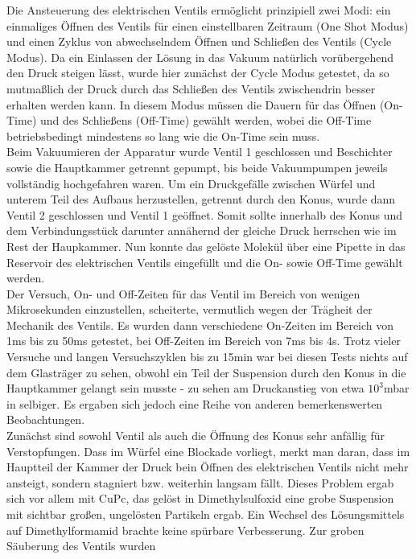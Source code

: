 Die Ansteuerung des elektrischen Ventils ermöglicht
prinzipiell zwei Modi: ein einmaliges Öffnen des
Ventils für einen einstellbaren Zeitraum (One
Shot Modus) und einen Zyklus von abwechselndem
Öffnen und Schließen des Ventils (Cycle Modus).
Da ein Einlassen der Lösung in das Vakuum
natürlich vorübergehend den Druck steigen lässt, wurde hier
zunächst der Cycle Modus getestet, da so
mutmaßlich der Druck durch das Schließen des
Ventils zwischendrin besser erhalten werden
kann. In diesem Modus müssen die Dauern für das
Öffnen (On-Time) und des Schließens (Off-Time)
gewählt werden, wobei die Off-Time
betriebsbedingt mindestens so lang wie die
On-Time sein muss.\\
Beim Vakuumieren der Apparatur wurde Ventil 1
 geschlossen und Beschichter sowie die 
 Hauptkammer getrennt gepumpt, bis beide
 Vakuumpumpen jeweils vollständig hochgefahren
 waren.
 Um ein Druckgefälle zwischen Würfel und unterem
 Teil des Aufbaus herzustellen, getrennt durch den
 Konus, wurde dann Ventil 2 geschlossen und
 Ventil 1 geöffnet.
 Somit sollte innerhalb des Konus und dem
 Verbindungsstück darunter annähernd der gleiche
 Druck herrschen wie im Rest der Haupkammer.
 Nun konnte das gelöste Molekül über eine Pipette
 in das Reservoir des elektrischen Ventils
 eingefüllt und die On- sowie Off-Time gewählt
 werden.\\
 Der Versuch, On- und Off-Zeiten für das Ventil im
Bereich von wenigen Mikrosekunden einzustellen,
scheiterte, vermutlich wegen der Trägheit der Mechanik des
Ventils. Es wurden dann verschiedene On-Zeiten im Bereich von 1ms bis zu 50ms getestet, bei
Off-Zeiten im Bereich von 7ms bis 4s. Trotz vieler Versuche und langen Versuchszyklen bis zu 15min
war bei diesen Tests nichts auf dem Glasträger zu sehen, obwohl ein Teil der Suspension durch den
Konus in die Hauptkammer gelangt sein musste - zu sehen am Druckanstieg von etwa $10^{3}$mbar in
selbiger. Es ergaben sich jedoch eine Reihe von anderen bemerkenswerten Beobachtungen.\\
Zunächst sind sowohl Ventil als auch die Öffnung des Konus sehr anfällig für Verstopfungen. Dass im
Würfel eine Blockade vorliegt, merkt man daran, dass im Hauptteil der Kammer der
Druck bein Öffnen des elektrischen Ventils nicht mehr ansteigt, sondern stagniert bzw. weiterhin
langsam fällt. Dieses Problem ergab sich vor allem mit CuPc, das gelöst in Dimethylsulfoxid eine
grobe Suspension mit sichtbar großen, ungelösten Partikeln ergab. Ein Wechsel des Lösungsmittels auf
Dimethylformamid brachte keine spürbare Verbesserung. Zur groben Säuberung des Ventils wurden
